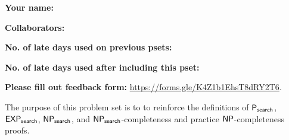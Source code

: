 \documentclass[11pt]{article}
\begin{document}


\textbf{Your name: }

\textbf{Collaborators: }

\textbf{No. of late days used on previous psets: }

\textbf{No. of late days used after including this pset: }

\textbf{Please fill out feedback form:} \href{https://forms.gle/K4Z1b1EhsT8dRY2T6}{https://forms.gle/K4Z1b1EhsT8dRY2T6}.

\vspace{1em}

\noindent The purpose of this problem set is to to reinforce the definitions of $\mathsf{P_{search}}$, $\mathsf{EXP_{search}}$, $\mathsf{NP_{search}}$, and $\mathsf{NP_{search}}$-completeness and practice $\mathsf{NP}$-completeness proofs. 
\end{document}
